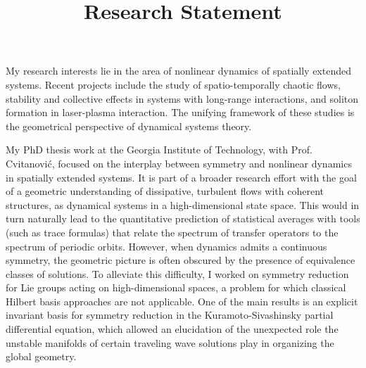 \documentclass[11pt,a4paper,final]{moderncv}
\title{Research Statement}               %
\begin{document}
\maketitle

\setlength{\parindent}{0.25in} %

My research interests lie in the area of nonlinear dynamics of spatially
extended systems. Recent projects include the study of spatio-temporally 
chaotic flows, stability and collective effects in systems with long-range 
interactions, and soliton formation in laser-plasma interaction. The 
unifying framework of these studies is the geometrical perspective
of dynamical systems theory.

My PhD thesis work at the Georgia Institute of Technology, with Prof. Cvitanovi\'c,
focused on the interplay between symmetry and nonlinear dynamics
in spatially extended systems. It is part of a broader research effort 
with the goal of a geometric understanding of dissipative, turbulent flows with coherent structures,
as dynamical systems in a high-dimensional state space. This would in turn
naturally lead to the quantitative prediction of statistical averages with tools
(such as trace formulas) that relate the spectrum of transfer operators to the
spectrum of periodic orbits. However, when dynamics admits a continuous
symmetry, the geometric picture is often obscured by the presence of equivalence
classes of solutions. To alleviate this difficulty, I worked on symmetry
reduction for Lie groups acting on high-dimensional spaces, a problem
for which classical Hilbert basis approaches are not applicable. One of the
main results is an explicit invariant basis for symmetry reduction in the
Kuramoto-Sivashinsky partial differential equation, which allowed an elucidation
of the unexpected role the unstable manifolds of certain traveling wave 
solutions play in organizing the global geometry. 
\end{document}

